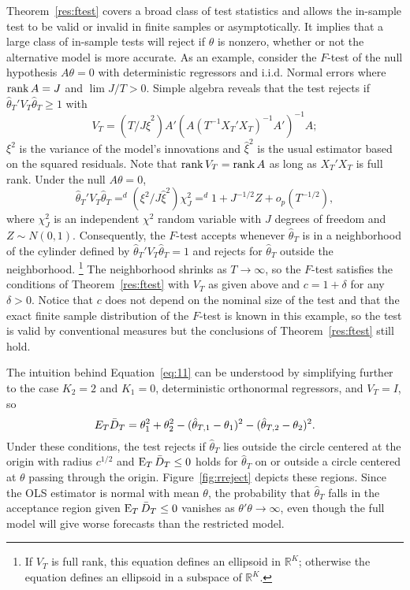 \documentclass[11pt]{article}
\begin{document}
Theorem~\ref{res:ftest} covers a broad class of test statistics and
allows the in-sample test to be valid or invalid in finite samples or
asymptotically.  It implies that a large class of in-sample tests will
reject if $\theta$ is nonzero, whether or not the alternative model is
more accurate.  As an example, consider the $F$-test of the null
hypothesis $A \theta =0$ with deterministic regressors and
i.i.d. Normal errors where $\operatorname*{rank} A = J$ and $\lim J/T > 0$.  Simple
algebra reveals that the test rejects if $\hat{\theta}_T' V_T
\hat{\theta}_T \geq 1$ with
\begin{equation*}
  V_T = (T/ J \hat{\xi}^{2}) A' (A (T^{-1}X_T'X_T)^{-1} A')^{-1} A;
\end{equation*}
$\xi^2$ is the variance of the model's innovations and $\hat{\xi}^2$ is
the usual estimator based on the squared residuals.  Note that $\operatorname*{rank}
V_T = \operatorname*{rank} A$ as long as $X_T'X_T$ is full rank.  Under the null $A
\theta = 0$,
\begin{equation*}
  \hat{\theta}_T' V_T
  \hat{\theta}_T =^d   (\xi^2/ J \hat{\xi}^2) \chi_J^2 =^d 1 + J^{-1/2} Z
  + o_p(T^{-1/2}),
\end{equation*}
where $\chi_J^2$ is an independent $\chi^2$ random variable with $J$
degrees of freedom and $Z \sim N(0,1)$.  Consequently, the $F$-test
accepts whenever $\hat{\theta}_T$ is in a neighborhood of the cylinder
defined by $\hat{\theta}_T' V_T \hat{\theta}_T = 1$ and rejects for
$\hat{\theta}_T$ outside the neighborhood.%
\footnote{If $V_T$ is full
  rank, this equation defines an ellipsoid in $\mathbb{R}^K$;
  otherwise the equation defines an ellipsoid in a subspace of
  $\mathbb{R}^K$.} %
The neighborhood shrinks as $T \to \infty$, so the
$F$-test satisfies the conditions of Theorem~\ref{res:ftest} with
$V_T$ as given above and $c = 1 + \delta$ for any $\delta > 0$.
Notice that $c$ does not depend on the nominal size of the test and
that the exact finite sample distribution of the $F$-test is known in
this example, so the test is valid by conventional measures but the
conclusions of Theorem~\ref{res:ftest} still hold.

The intuition behind Equation~\eqref{eq:11} can be understood by
simplifying further to the case $K_2 = 2$ and $K_1 = 0$, deterministic
orthonormal regressors, and $V_T = I$, so
\begin{equation*}
  E_T \bar{D}_{T} = \theta_{1}^2 + \theta_{2}^2 - (\hat{\theta}_{T,1} -
  \theta_{1})^2 - (\hat\theta_{T,2} - \theta_2)^2.
\end{equation*}
Under these conditions, the test rejects if $\hat{\theta}_{T}$ lies
outside the circle centered at the origin with radius $c^{1/2}$ and
$\operatorname{E}_T \bar{D}_{T} \leq 0$ holds for $\hat\theta_{T}$ on or outside a circle
centered at $\theta$ passing through the origin.
Figure~\ref{fig:rreject} depicts these regions.  Since the OLS
estimator is normal with mean $\theta$, the probability that
$\hat{\theta}_{T}$ falls in the acceptance region given $\operatorname{E}_T \bar{D}_{T}
\leq 0$ vanishes as $\theta'\theta \to \infty$, even though the full
model will give worse forecasts than the restricted model.
\end{document}
